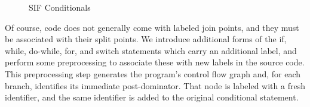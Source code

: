 \documentclass{llncs}
\begin{document}
\begin{table}[t]
\begin{figure}
  \begin{minipage}{0.55\textwidth}
  \end{minipage}
  \begin{minipage}{0.35\textwidth}

  \end{minipage}
  
  \caption{SIF Conditionals}
  \label{fig:SIFconditionals}
\end{figure}

Of course, code does not generally come with labeled join points, and they must be associated
with their split points. We introduce additional forms of the if, while, do-while, for, and switch
statements which carry an additional label, and perform some preprocessing to associate these
with new labels in the source code. This preprocessing step generates the program's
control flow graph and, for each branch, identifies its immediate post-dominator. That
node is labeled with  a fresh identifier, and the same identifier is added to the original
conditional statement.

%
%
%


\end{table}
\end{document}
